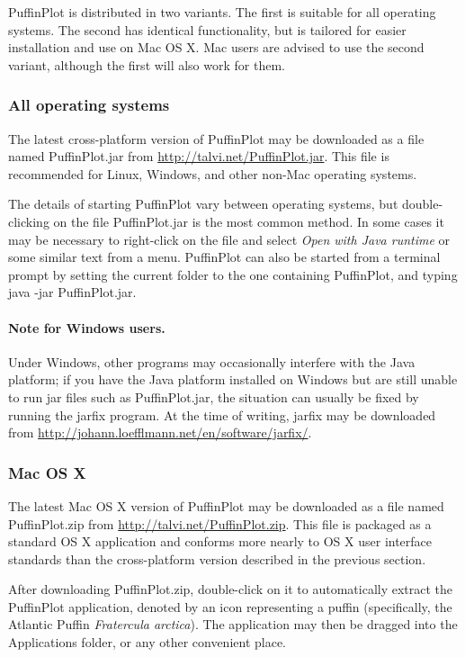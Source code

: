 \documentclass[a4paper,british]{article}
\newcommand{\ppcmd}[1]{\textsf{#1}} %
\begin{document}
PuffinPlot is distributed in two variants. The first is suitable for all
operating systems. The second has identical functionality, but is
tailored for easier installation and use on Mac OS X. Mac users are
advised to use the second variant, although the first will also work for
them.

\subsubsection{All operating systems}

The latest cross-platform version of PuffinPlot may be downloaded as a file
named \textsf{PuffinPlot.jar} from
\url{http://talvi.net/PuffinPlot.jar}. This file is recommended for
Linux, Windows, and other non-Mac operating systems.

The details of starting PuffinPlot vary between operating systems, but
double-clicking on the file \textsf{PuffinPlot.jar} is the most common
method. In some cases it may be necessary to right-click on the file and
select \emph{Open with Java runtime} or some similar text from a menu.
PuffinPlot can also be started from a terminal prompt by setting the
current folder to the one containing PuffinPlot, and typing
\textsf{java -jar PuffinPlot.jar}.

\paragraph{Note for Windows users.} Under Windows, other programs may
occasionally interfere with the Java platform; if you have the Java platform
installed on Windows but are still unable to run \ppcmd{jar} files such as
\ppcmd{PuffinPlot.jar}, the situation can usually be fixed by running the
\ppcmd{jarfix} program. At the time of writing, \ppcmd{jarfix} may be
downloaded from \url{http://johann.loefflmann.net/en/software/jarfix/}.

\subsubsection{Mac OS X}

The latest Mac OS X version of PuffinPlot may be downloaded as a file
named \textsf{PuffinPlot.zip} from
\url{http://talvi.net/PuffinPlot.zip}. This file is packaged as a
standard OS X application and conforms more nearly to OS X user
interface standards than the cross-platform version described in the
previous section.

After downloading \textsf{PuffinPlot.zip}, double-click on it to
automatically extract the PuffinPlot application, denoted by an icon
representing a puffin (specifically, the Atlantic Puffin
\emph{Fratercula arctica}). The application may then be dragged into the
Applications folder, or any other convenient place.
\end{document}
